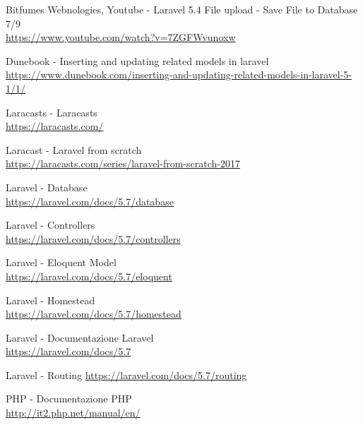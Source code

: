 \documentclass[a4paper,12pt]{book}
\begin{document}
	
	
	
	\tableofcontents
	
	\frontmatter
	
	\mainmatter
	
	
	
	
	
	
	
	
	\backmatter
	\renewcommand\bibname{Sitografia}
	\begin{thebibliography}{100}

		 Bitfumes Webnologies, Youtube - Laravel 5.4 File upload - Save File to Database 7/9 \\
		\url{https://www.youtube.com/watch?v=7ZGFWvunoxw}	
		
		 Dunebook - Inserting and updating related models in laravel \\
		\url{https://www.dunebook.com/inserting-and-updating-related-models-in-laravel-5-1/1/}
	
		 Laracasts - Laracasts \\
		\url{https://laracasts.com/}	
		
		 Laracast - Laravel from scratch \\
		\url{https://laracasts.com/series/laravel-from-scratch-2017}
		
		 Laravel - Database \\
		\url{https://laravel.com/docs/5.7/database}
		
		 Laravel - Controllers \\
		\url{https://laravel.com/docs/5.7/controllers}
		
		 Laravel - Eloquent Model \\
		\url{https://laravel.com/docs/5.7/eloquent}
		
		 Laravel - Homestead \\
		\url{https://laravel.com/docs/5.7/homestead}
		
		 Laravel - Documentazione Laravel\\
		\url{https://laravel.com/docs/5.7}
		
		 Laravel - Routing
		\url{https://laravel.com/docs/5.7/routing}
	
		 PHP - Documentazione PHP \\
		\url{http://it2.php.net/manual/en/}
	

\end{thebibliography}
\end{document}
